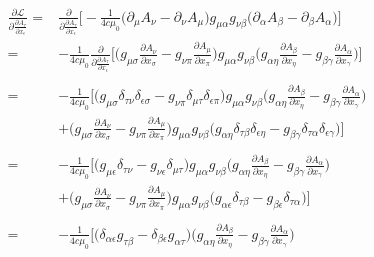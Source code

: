 \documentclass{article}
\begin{document}
\begin{align}
  \frac{\partial \mathcal{L}}{\partial\frac{\partial A_\tau}{\partial x_\epsilon}}
  = & \frac{\partial}{\partial\frac{\partial A_\tau}{\partial x_\epsilon}}
  \bigg[
  -\frac{1}{4 c \mu_0}
  \big(\partial_\mu A_\nu - \partial_\nu A_\mu \big)
  g_{\mu\alpha} g_{\nu\beta}
  \big(\partial_\alpha A_\beta - \partial_\beta A_\alpha\big)
  \bigg] \\
  = & -\frac{1}{4 c \mu_0} \frac{\partial}{\partial\frac{\partial A_\tau}{\partial x_\epsilon}}
  \bigg[
  \bigg(g_{\mu\sigma} \frac{\partial A_\nu}{\partial x_\sigma} - g_{\nu\pi} \frac{\partial A_\mu}{\partial x_\pi} \bigg)
  g_{\mu\alpha} g_{\nu\beta}
  \bigg(g_{\alpha\eta} \frac{\partial A_\beta}{\partial x_\eta} - g_{\beta\gamma} \frac{\partial A_\alpha}{\partial x_\gamma} \bigg)
  \bigg] \nonumber \\ \\
  = & -\frac{1}{4 c \mu_0}
  \bigg[
  \bigg(g_{\mu\sigma} \delta_{\tau\nu}\delta_{\epsilon\sigma} - g_{\nu\pi}\delta_{\mu\tau}\delta_{\epsilon\pi} \bigg)
  g_{\mu\alpha} g_{\nu\beta}
  \bigg(g_{\alpha\eta} \frac{\partial A_\beta}{\partial x_\eta} - g_{\beta\gamma} \frac{\partial A_\alpha}{\partial x_\gamma} \bigg) \nonumber \\
  & +  \bigg(g_{\mu\sigma} \frac{\partial A_\nu}{\partial x_\sigma} - g_{\nu\pi} \frac{\partial A_\mu}{\partial x_\pi} \bigg)
  g_{\mu\alpha} g_{\nu\beta}
  \bigg( g_{\alpha\eta}\delta_{\tau\beta}\delta_{\epsilon\eta} - g_{\beta\gamma}\delta_{\tau\alpha}\delta_{\epsilon\gamma} \bigg)
  \bigg] \nonumber \\ \\
  = & -\frac{1}{4 c \mu_0}
  \bigg[
  \bigg(g_{\mu\epsilon} \delta_{\tau\nu} - g_{\nu\epsilon}\delta_{\mu\tau} \bigg)
  g_{\mu\alpha} g_{\nu\beta}
  \bigg(g_{\alpha\eta} \frac{\partial A_\beta}{\partial x_\eta} - g_{\beta\gamma} \frac{\partial A_\alpha}{\partial x_\gamma} \bigg) \nonumber \\
  & +  \bigg(g_{\mu\sigma} \frac{\partial A_\nu}{\partial x_\sigma} - g_{\nu\pi} \frac{\partial A_\mu}{\partial x_\pi} \bigg)
  g_{\mu\alpha} g_{\nu\beta}
  \bigg( g_{\alpha\epsilon}\delta_{\tau\beta} - g_{\beta\epsilon}\delta_{\tau\alpha} \bigg)
  \bigg] \nonumber \\ \\
  = & -\frac{1}{4 c \mu_0}
  \bigg[
  \bigg(\delta_{\alpha\epsilon} g_{\tau\beta} - \delta_{\beta\epsilon}g_{\alpha\tau} \bigg)
  \bigg(g_{\alpha\eta} \frac{\partial A_\beta}{\partial x_\eta} - g_{\beta\gamma} \frac{\partial A_\alpha}{\partial x_\gamma} \bigg) \nonumber \\

\end{align}
\end{document}
